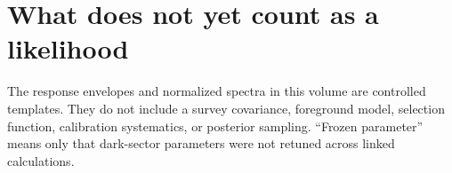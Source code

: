 \section{What does not yet count as a likelihood}
The response envelopes and normalized spectra in this volume are controlled templates. They do not include a survey covariance, foreground model, selection function, calibration systematics, or posterior sampling. ``Frozen parameter'' means only that dark-sector parameters were not retuned across linked calculations.
